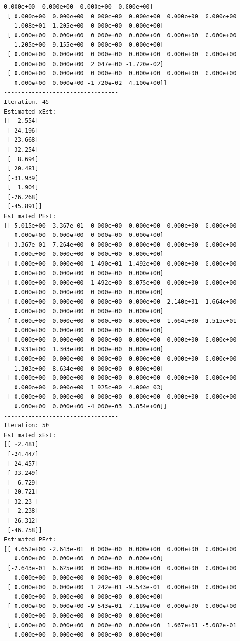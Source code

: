 \documentclass[11pt]{article}
\begin{document}
\begin{Verbatim}[commandchars=\\\{\}]
   0.000e+00  0.000e+00  0.000e+00  0.000e+00]
 [ 0.000e+00  0.000e+00  0.000e+00  0.000e+00  0.000e+00  0.000e+00
   1.008e+01  1.205e+00  0.000e+00  0.000e+00]
 [ 0.000e+00  0.000e+00  0.000e+00  0.000e+00  0.000e+00  0.000e+00
   1.205e+00  9.155e+00  0.000e+00  0.000e+00]
 [ 0.000e+00  0.000e+00  0.000e+00  0.000e+00  0.000e+00  0.000e+00
   0.000e+00  0.000e+00  2.047e+00 -1.720e-02]
 [ 0.000e+00  0.000e+00  0.000e+00  0.000e+00  0.000e+00  0.000e+00
   0.000e+00  0.000e+00 -1.720e-02  4.100e+00]]
---------------------------------
Iteration: 45
Estimated xEst:
[[ -2.554]
 [-24.196]
 [ 23.668]
 [ 32.254]
 [  8.694]
 [ 20.481]
 [-31.939]
 [  1.904]
 [-26.268]
 [-45.891]]
Estimated PEst:
[[ 5.015e+00 -3.367e-01  0.000e+00  0.000e+00  0.000e+00  0.000e+00
   0.000e+00  0.000e+00  0.000e+00  0.000e+00]
 [-3.367e-01  7.264e+00  0.000e+00  0.000e+00  0.000e+00  0.000e+00
   0.000e+00  0.000e+00  0.000e+00  0.000e+00]
 [ 0.000e+00  0.000e+00  1.490e+01 -1.492e+00  0.000e+00  0.000e+00
   0.000e+00  0.000e+00  0.000e+00  0.000e+00]
 [ 0.000e+00  0.000e+00 -1.492e+00  8.075e+00  0.000e+00  0.000e+00
   0.000e+00  0.000e+00  0.000e+00  0.000e+00]
 [ 0.000e+00  0.000e+00  0.000e+00  0.000e+00  2.140e+01 -1.664e+00
   0.000e+00  0.000e+00  0.000e+00  0.000e+00]
 [ 0.000e+00  0.000e+00  0.000e+00  0.000e+00 -1.664e+00  1.515e+01
   0.000e+00  0.000e+00  0.000e+00  0.000e+00]
 [ 0.000e+00  0.000e+00  0.000e+00  0.000e+00  0.000e+00  0.000e+00
   8.931e+00  1.303e+00  0.000e+00  0.000e+00]
 [ 0.000e+00  0.000e+00  0.000e+00  0.000e+00  0.000e+00  0.000e+00
   1.303e+00  8.634e+00  0.000e+00  0.000e+00]
 [ 0.000e+00  0.000e+00  0.000e+00  0.000e+00  0.000e+00  0.000e+00
   0.000e+00  0.000e+00  1.925e+00 -4.000e-03]
 [ 0.000e+00  0.000e+00  0.000e+00  0.000e+00  0.000e+00  0.000e+00
   0.000e+00  0.000e+00 -4.000e-03  3.854e+00]]
---------------------------------
Iteration: 50
Estimated xEst:
[[ -2.481]
 [-24.447]
 [ 24.457]
 [ 33.249]
 [  6.729]
 [ 20.721]
 [-32.23 ]
 [  2.238]
 [-26.312]
 [-46.758]]
Estimated PEst:
[[ 4.652e+00 -2.643e-01  0.000e+00  0.000e+00  0.000e+00  0.000e+00
   0.000e+00  0.000e+00  0.000e+00  0.000e+00]
 [-2.643e-01  6.625e+00  0.000e+00  0.000e+00  0.000e+00  0.000e+00
   0.000e+00  0.000e+00  0.000e+00  0.000e+00]
 [ 0.000e+00  0.000e+00  1.242e+01 -9.543e-01  0.000e+00  0.000e+00
   0.000e+00  0.000e+00  0.000e+00  0.000e+00]
 [ 0.000e+00  0.000e+00 -9.543e-01  7.189e+00  0.000e+00  0.000e+00
   0.000e+00  0.000e+00  0.000e+00  0.000e+00]
 [ 0.000e+00  0.000e+00  0.000e+00  0.000e+00  1.667e+01 -5.082e-01
   0.000e+00  0.000e+00  0.000e+00  0.000e+00]

\end{Verbatim}
\end{document}
